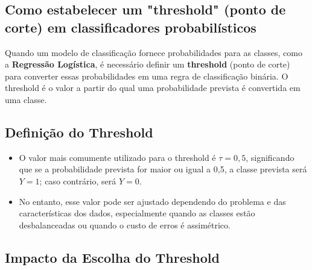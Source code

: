 \documentclass{sciposter}
\begin{document}
\begin{multicols}{3}
\section{Como estabelecer um "threshold" (ponto de corte) em classificadores probabilísticos}

Quando um modelo de classificação fornece probabilidades para as classes, como a \textbf{Regressão Logística}, é necessário definir um \textbf{threshold} (ponto de corte) para converter essas probabilidades em uma regra de classificação binária. O threshold é o valor a partir do qual uma probabilidade prevista é convertida em uma classe.

\subsection{Definição do Threshold}

\begin{itemize}
    \item O valor mais comumente utilizado para o threshold é $\tau = 0{,}5$, significando que se a probabilidade prevista for maior ou igual a 0,5, a classe prevista será $Y=1$; caso contrário, será $Y=0$.
    \item No entanto, esse valor pode ser ajustado dependendo do problema e das características dos dados, especialmente quando as classes estão desbalanceadas ou quando o custo de erros é assimétrico.
\end{itemize}

\subsection{Impacto da Escolha do Threshold}


\end{multicols}
\end{document}

